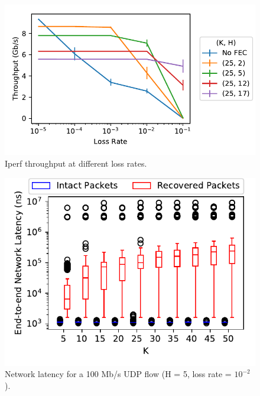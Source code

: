\begin{figure}
  \centering
  \includegraphics[width=0.3\paperwidth]{figures/lossVsTput.pdf}
  \caption{\label{fig:lossVsTput} Iperf throughput at different loss rates.}
\end{figure}

\begin{figure}
  \centering
  \includegraphics[width=0.3\paperwidth]{figures/udpLatency.pdf}
  \caption{\label{fig:lossVsLatencyUdp} Network latency for a 100 Mb/s UDP flow (H = 5, loss rate = $10 ^{-2}$).}
\end{figure}

